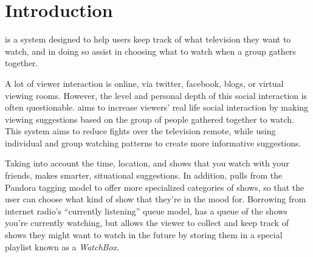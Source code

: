 \section{Introduction}

{\sys} is a system designed to help users keep track of what
television they want to watch, and in doing so assist in choosing what
to watch when a group gathers together.

A lot of viewer interaction is online, via twitter, facebook, blogs,
or virtual viewing rooms.  However, the level and personal depth of
this social interaction is often questionable.  {\sys} aims to
increase viewers' real life social interaction by making viewing
suggestions based on the group of people gathered together to
watch. This system aims to reduce fights over the television remote,
while using individual and group watching patterns to create more
informative suggestions.

Taking into account the time, location, and shows that you watch with
your friends, {\sys} makes smarter, situational suggestions.  In
addition, {\sys} pulls from the Pandora tagging model to offer more
specialized categories of shows, so that the user can choose what kind
of show that they're in the mood for.  Borrowing from internet radio’s
“currently listening” queue model, {\sys} has a queue of the shows
you’re currently watching, but allows the viewer to collect and keep
track of shows they might want to watch in the future by storing them
in a special playlist known as a \emph{WatchBox}.  

